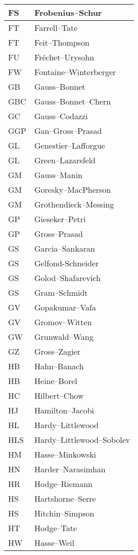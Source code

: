 \documentclass{amsart}
\numberwithin{equation}{section}
\theoremstyle{plain}
\numberwithin{equation}{section}
\theoremstyle{remark}
\begin{document}
\begin{multicols}{2}
{\begin{longtable}{l|l}
FS & Frobenius--Schur\\ \hline
FT & Farrell--Tate\\ \hline
FT & Feit--Thompson\\ \hline
FU & Fréchet--Urysohn\\ \hline
FW & Fontaine--Winterberger\\ \hline
GB & Gauss--Bonnet\\ \hline
GBC & Gauss--Bonnet--Chern\\ \hline
GC & Gauss--Codazzi\\ \hline
GGP & Gan--Gross--Prasad\\ \hline
GL & Genestier--Lafforgue\\ \hline
GL & Green--Lazarsfeld\\ \hline
GM & Gauss--Manin\\ \hline
GM & Goresky--MacPherson\\ \hline
GM & Grothendieck--Messing\\ \hline
GP & Gieseker--Petri\\ \hline
GP & Gross--Prasad\\ \hline
GS & Garcia--Sankaran\\ \hline
GS & Gelfond-Schneider\\ \hline
GS & Golod--Shafarevich\\ \hline
GS & Gram--Schmidt\\ \hline
GV & Gopakumar--Vafa\\ \hline
GV & Gromov--Witten\\ \hline
GW & Grunwald--Wang\\ \hline
GZ & Gross--Zagier\\ \hline
HB & Hahn--Banach\\ \hline
HB & Heine--Borel\\ \hline
HC & Hilbert--Chow\\ \hline
HJ & Hamilton--Jacobi\\ \hline
HL & Hardy--Littlewood\\ \hline
HLS & Hardy--Littlewood--Sobolev\\ \hline
HM & Hasse--Minkowski\\ \hline
HN & Harder--Narasimhan\\ \hline
HR & Hodge--Riemann\\ \hline
HS & Hartshorne--Serre\\ \hline
HS & Hitchin--Simpson\\ \hline
HT & Hodge--Tate\\ \hline
HW & Hasse--Weil\\ \hline

\end{longtable}}
\end{multicols}
\end{document}
